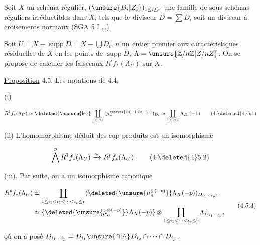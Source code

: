 

 Soit $X$ un schéma régulier, $(\unsure{D_i|Z_i})_{1\leq i\leq r}$ une famille de  sous-schémas réguliers irréductibles dans $X$, tels que le diviseur $D=\sum D_i$ soit un diviseur à croisements normaux (SGA 5 I \ldots).

Soit $U=X-\operatorname{supp}D=X-\bigcup D_i$,  $n$ un entier premier aux caractéristiques résiduelles de $X$ en les points de  $\operatorname{supp}D$, $\Lambda=\unsure{\mathbb Z/n\mathbb Z|Z/nZ}$. On se propose de calculer les faisceaux $R^i f_*(\Lambda_U)$ sur $X$. 

\uline{Proposition} 4.5.  Les notations  de 4.4, 

(i)  

\[
R^1f_*(\Lambda_U)\simeq\deleted{\unsure{\text{le}}}\coprod_{1\leq i\leq r}(\mu_n^{\unsure{\otimes(-1|\otimes(-1)}})_{D_i}\simeq\coprod_{1\leq i\leq r}\Lambda_{D_i}(-1)
\tag*{(4.\deleted{4}5.1)}
\]

(ii)   L'homomorphisme  déduit des cup-produits est un  isomorphisme

\[
\bigwedge^p R^1 f_*(\Lambda_U)\xrightarrow{\sim}R^p f_*(\Lambda_U).
\tag*{(4.\deleted{4}5.2)}
\]

(iii). Par suite,  on a un isomorphisme canonique

\[
\begin{aligned}
R^p f_*(\Lambda_U)&\simeq\coprod_{1\leq i_1<i_2<\cdots<i_p\leq r}(\deleted{\unsure{\mu_n^{\otimes(-p)}}}\Lambda_X(-p))_{D_{i_1\cdots i_p}},\\
&\simeq\{\deleted{\unsure{\mu_n^{\otimes(-p)}}}\Lambda_X(-p)\}\otimes\coprod_{1\leq i_1<\cdots<i_p\leq r}\Lambda_{D_{i_1\cdots i_p}},
\end{aligned}
\tag*{(4.5.3)}
\]

 où on a posé $D_{i_1\cdots i_p}=D_{i_1}\unsure{\cap|\wedge}D_{i_2}\cap\cdots\cap D_{i_p}$.
